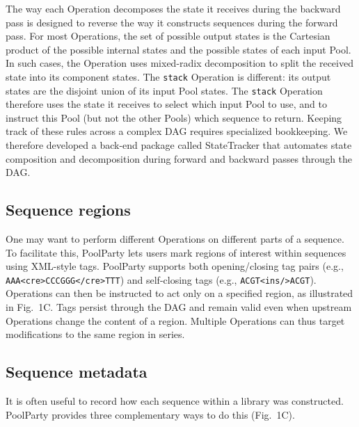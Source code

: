\documentclass[pdflatex,sn-vancouver-num,referee,oneside]{sn-jnl}
\begin{document}
The way each Operation decomposes the state it receives during the backward pass is designed to reverse the way it constructs sequences during the forward pass. For most Operations, the set of possible output states is the Cartesian product of the possible internal states and the possible states of each input Pool. In such cases, the Operation uses mixed-radix decomposition to split the received state into its component states. The \texttt{stack} Operation is different: its output states are the disjoint union of its input Pool states. The \texttt{stack} Operation therefore uses the state it receives to select which input Pool to use, and to instruct this Pool (but not the other Pools) which sequence to return. Keeping track of these rules across a complex DAG requires specialized bookkeeping. We therefore developed a back-end package called StateTracker that automates state composition and decomposition during forward and backward passes through the DAG.

\subsection*{Sequence regions}\label{subsec:sequence-regions}

One may want to perform different Operations on different parts of a sequence. To facilitate this, PoolParty lets users mark regions of interest within sequences using XML-style tags. PoolParty supports both opening/closing tag pairs (e.g., \texttt{AAA<cre>CCCGGG</cre>TTT}) and self-closing tags (e.g., \texttt{ACGT<ins/>ACGT}). Operations can then be instructed to act only on a specified region, as illustrated in Fig.~1C. Tags persist through the DAG and remain valid even when upstream Operations change the content of a region. Multiple Operations can thus target modifications to the same region in series.

\subsection*{Sequence metadata}\label{subsec:sequence-metadata}

It is often useful to record how each sequence within a library was constructed. PoolParty provides three complementary ways to do this (Fig.~1C).
\end{document}
